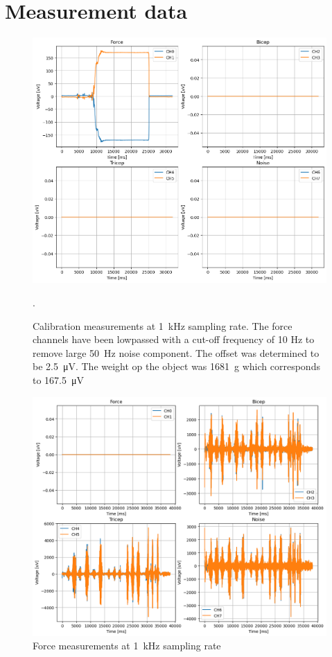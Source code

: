 \section{Measurement data}

\begin{figure}[h!t]
	\begin{center}
		\includegraphics[width=1.0\columnwidth]{images/measurement_calibratie2_1k.png}
	\end{center}
	\caption{Calibration measurements at \SI{1}{\kilo\hertz} sampling rate. The force channels have been lowpassed with a cut-off frequency of 10 Hz to remove large \SI{50}{\hertz} noise component. The offset was determined to be \SI{2.5}{\micro\volt}. The weight op the object was \SI{1681}{\gram} which corresponds to \SI{167.5}{\micro\volt}}.
	\label{fig:calibration_1k}
\end{figure}

\begin{figure}[h!t]
	\begin{center}
		\includegraphics[width=0.8\columnwidth]{images/measurement_meting2_1k.png}
	\end{center}
	\caption{Force measurements at \SI{1}{\kilo\hertz} sampling rate}
	\label{fig:measurement_1k}
\end{figure}

